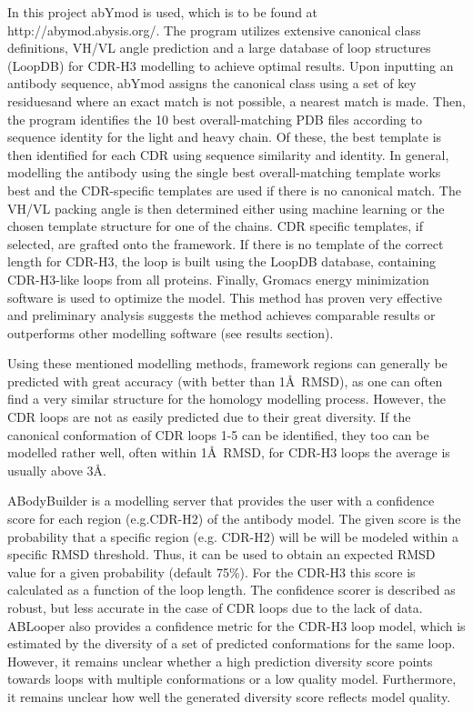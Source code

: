 \documentclass[12pt]{article}
\begin{document}
In this project abYmod is used, which is to be found at
http://abymod.abysis.org/. The program utilizes extensive canonical
class definitions, VH/VL angle prediction and a large database of loop
structures (LoopDB) for CDR-H3 modelling to achieve optimal
results. Upon inputting an antibody sequence, abYmod assigns the
canonical class using a set of key residues\cite{Martin1996}and where
an exact match is not possible, a nearest match is made. Then, the
program identifies the 10 best overall-matching PDB files according to
sequence identity for the light and heavy chain. Of these, the best
template is then identified for each CDR using sequence similarity and
identity. In general, modelling the antibody using the single best
overall-matching template works best and the CDR-specific templates
are used if there is no canonical match. The VH/VL packing angle is
then determined either using machine learning or the chosen template
structure for one of the chains. CDR specific templates, if selected,
are grafted onto the framework. If there is no template of the correct
length for CDR-H3, the loop is built using the LoopDB database,
containing CDR-H3-like loops from all proteins. Finally, Gromacs energy
minimization software is used to optimize the model. This method has
proven very effective and preliminary analysis suggests the method
achieves comparable results or outperforms other modelling software
(see results section).

Using these mentioned modelling methods, framework regions can
generally be predicted with great accuracy (with better than 1\AA\
RMSD\cite{Almagro2014}), as one can often find a very similar
structure for the homology modelling process.  However, the CDR loops
are not as easily predicted due to their great diversity. If the
canonical conformation of CDR loops 1-5 can be identified, they too
can be modelled rather well, often within 1\AA\ RMSD, for CDR-H3 loops
the average is usually above 3\AA\cite{Almagro2011}.

ABodyBuilder is a modelling server that provides the user with a
confidence score for each region (e.g.CDR-H2) of the antibody
model. The given score is the probability that a specific region
(e.g. CDR-H2) will be will be modeled within a specific RMSD
threshold\cite{Leem2016}. Thus, it can be used to obtain an expected
RMSD value for a given probability (default 75\%). For the CDR-H3 this
score is calculated as a function of the loop length.  The confidence
scorer is described as robust, but less accurate in the case of CDR
loops due to the lack of data\cite{Leem2016}. ABLooper also provides a
confidence metric for the CDR-H3 loop model, which is estimated by the
diversity of a set of predicted conformations for the same
loop\cite{Abanades2022}. However, it remains unclear whether a high
prediction diversity score points towards loops with multiple
conformations or a low quality model. Furthermore, it remains unclear
how well the generated diversity score reflects model
quality\cite{Abanades2022}.
\end{document}
